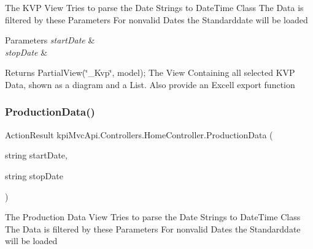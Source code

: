 The K\+VP View Tries to parse the Date Strings to Date\+Time Class The Data is filtered by these Parameters For nonvalid Dates the Standarddate will be loaded 


\begin{DoxyParams}{Parameters}
{\em start\+Date} & \\
\hline
{\em stop\+Date} & \\
\hline
\end{DoxyParams}
\begin{DoxyReturn}{Returns}
{\ttfamily Partial\+View(\char`\"{}\+\_\+\+Kvp\char`\"{}, model);} The View Containing all selected K\+VP Data, shown as a diagram and a List. Also provide an Excell export function 
\end{DoxyReturn}
\mbox{\label{classkpi_mvc_api_1_1_controllers_1_1_home_controller_ae5c2fcc4413eda2cab2775cd9819efca}} 
\subsubsection{\texorpdfstring{Production\+Data()}{ProductionData()}}
{\footnotesize\ttfamily Action\+Result kpi\+Mvc\+Api.\+Controllers.\+Home\+Controller.\+Production\+Data (\begin{DoxyParamCaption}\item[{string}]{start\+Date,  }\item[{string}]{stop\+Date }\end{DoxyParamCaption})\hspace{0.3cm}{\ttfamily [inline]}}



The Production Data View Tries to parse the Date Strings to Date\+Time Class The Data is filtered by these Parameters For nonvalid Dates the Standarddate will be loaded 


